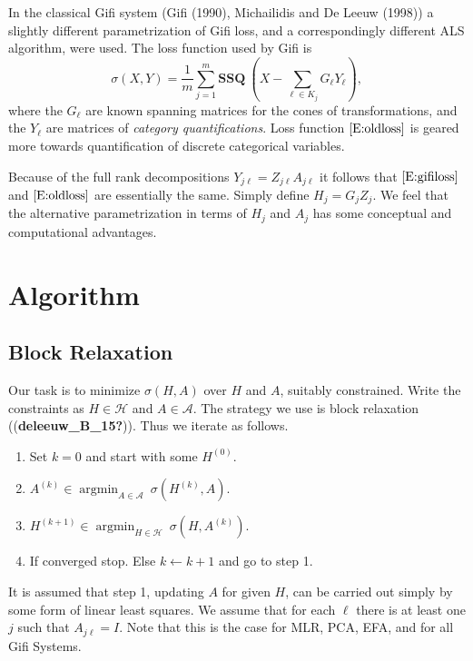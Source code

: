 \documentclass[
  12pt,
  letterpaper,
  DIV=11,
  numbers=noendperiod]{scrreprt}
\providecommand{\tightlist}{%
  \setlength{\itemsep}{0pt}\setlength{\parskip}{0pt}}
\newcommand{\amin}[1]{\mathop{\text{argmin}}_{#1}}
\begin{document}
In the classical Gifi system (Gifi (1990), Michailidis and De Leeuw
(1998)) a slightly different parametrization of Gifi loss, and a
correspondingly different ALS algorithm, were used. The loss function
used by Gifi is \begin{equation}
\sigma(X,Y)=\frac{1}{m}\sum_{j=1}^m\mathbf{SSQ}\ (X-\sum_{\ell\in K_j}G_\ell Y_\ell),\label{E:oldloss}
\end{equation} where the \(G_\ell\) are known spanning matrices for the
cones of transformations, and the \(Y_\ell\) are matrices of
\emph{category quantifications}. Loss function \(\eqref{E:oldloss}\) is
geared more towards quantification of discrete categorical variables.

Because of the full rank decompositions \(Y_{j\ell}=Z_{j\ell}A_{j\ell}\)
it follows that \(\eqref{E:gifiloss}\) and \(\eqref{E:oldloss}\) are
essentially the same. Simply define \(H_j=G_jZ_j\). We feel that the
alternative parametrization in terms of \(H_j\) and \(A_j\) has some
conceptual and computational advantages.


\chapter{Algorithm}\label{algorithm}

\section{Block Relaxation}\label{block-relaxation}

Our task is to minimize \(\sigma(H,A)\) over \(H\) and \(A\), suitably
constrained. Write the constraints as \(H\in\mathcal{H}\) and
\(A\in\mathcal{A}\). The strategy we use is block relaxation
((\textbf{deleeuw\_B\_15?})). Thus we iterate as follows.

\begin{enumerate}
\def\labelenumi{\arabic{enumi}.}
\setcounter{enumi}{-1}
\tightlist
\item
  Set \(k=0\) and start with some \(H^{(0)}\).
\item
  \(A^{(k)}\in\amin{A\in\mathcal{A}}\ \sigma(H^{(k)},A)\).
\item
  \(H^{(k+1)}\in\amin{H\in\mathcal{H}}\ \sigma(H,A^{(k)})\).
\item
  If converged stop. Else \(k\leftarrow k+1\) and go to step 1.
\end{enumerate}

It is assumed that step 1, updating \(A\) for given \(H\), can be
carried out simply by some form of linear least squares. We assume that
for each \(\ell\) there is at least one \(j\) such that \(A_{j\ell}=I\).
Note that this is the case for MLR, PCA, EFA, and for all Gifi Systems.
\end{document}
